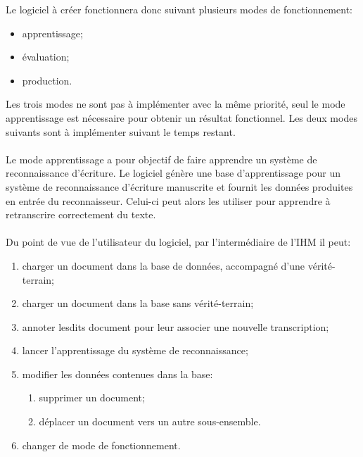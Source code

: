 Le logiciel à créer fonctionnera donc suivant plusieurs modes de fonctionnement:

\begin{itemize}
	\item apprentissage;
	\item évaluation;
	\item production.
\end{itemize}

Les trois modes ne sont pas à implémenter avec la même priorité, seul le mode apprentissage est nécessaire pour obtenir un résultat fonctionnel. Les deux modes suivants sont à implémenter suivant le temps restant. 

\paragraph{}

Le mode apprentissage a pour objectif de faire apprendre un système de reconnaissance d’écriture. Le logiciel génère une base d’apprentissage pour un système de reconnaissance d’écriture manuscrite et fournit les données produites en entrée du reconnaisseur. Celui-ci peut alors les utiliser pour apprendre à retranscrire correctement du texte.

\paragraph{}

Du point de vue de l'utilisateur du logiciel, par l’intermédiaire de l’IHM il peut:

\begin{enumerate}
	\item charger un document dans la base de données, accompagné d’une vérité-terrain;
	\item charger un document dans la base sans vérité-terrain;
	\item annoter lesdits document pour leur associer une nouvelle transcription;
	\item lancer l’apprentissage du système de reconnaissance;
	\item modifier les données contenues dans la base:
		\begin{enumerate}
			\item supprimer un document;
			\item déplacer un document vers un autre sous-ensemble.
		\end{enumerate}
	\item changer de mode de fonctionnement.
\end{enumerate}


